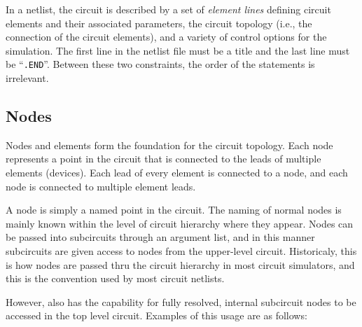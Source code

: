 In a netlist, the circuit is described by a set of \emph{element
lines\/} defining circuit elements and their associated parameters, the circuit topology (i.e., the connection of the circuit elements), and a variety of control options for the simulation. 
The first line in the netlist
file must be a title and the last line must
be ``\texttt{.END}''.  Between these two
constraints, the order of the statements is irrelevant.

\subsection{Nodes}

Nodes and elements form the foundation for the circuit topology. Each node represents a point in the circuit that is connected to the leads of multiple elements (devices). Each lead of every element is connected to a node, and each node is connected to multiple element leads.

A node is simply a named point in the circuit.  The naming of normal nodes is mainly known within the level of circuit hierarchy where they appear.  Nodes can be passed into subcircuits through an argument list, and in this manner subcircuits are given access to nodes from the upper-level circuit.  Historicaly, this is how nodes are passed thru the circuit hierarchy in most circuit simulators, and this is the convention used by most circuit netlists.

However, \Xyce{} also has the capability for fully resolved, internal subcircuit nodes to be accessed in the top level circuit.  Examples of this usage are as follows:
\begin{centering}
\end{centering}

